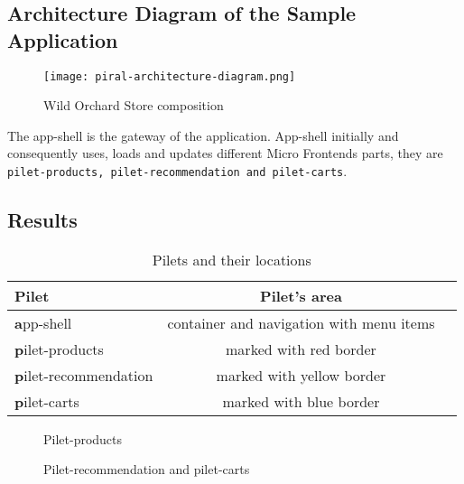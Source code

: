 \documentclass[a4paper]{book}
\begin{document}
\subsection{Architecture Diagram of the Sample Application}
\clearpage
\begin{figure}[ht!]
  \centering
  \captionsetup{justification=centering}
  \texttt{[image: piral-architecture-diagram.png]}
  \caption{Wild Orchard Store composition}
  \label{fig:piral-architecture-diagram}
\end{figure}
The app-shell is the gateway of the application. App-shell initially and consequently uses, loads and updates different Micro Frontends parts, they are \verb|pilet-products, pilet-recommendation and pilet-carts|.

\subsection{Results}

\begin{table}[h!]
    \captionsetup{justification=centering}
    \caption{Pilets and their locations}
    \label{tab:example_1}
    \centering
    \begin{tabular}{l | cc}
	\toprule
			\textbf{Pilet} & \textbf{Pilet's area}\\
	\midrule
	\textbf app-shell & container and navigation with menu items\\
	\textbf pilet-products              & marked with red border\\
	\textbf pilet-recommendation             & marked with yellow border\\
	\textbf pilet-carts              & marked with blue border\\
	\bottomrule
    \end{tabular}
\end{table}


\begin{figure}[h!]
    \centering
    \captionsetup{justification=centering}
    \hspace*{0.1\hsize}
    \caption{Pilet-products}
    \label{fig:Pilet-products}
\end{figure}

\begin{figure}[h!]
    \centering
    \captionsetup{justification=centering}
    \hspace*{0.1\hsize}
    \caption{Pilet-recommendation and pilet-carts}
    \label{fig:ui-product-details-repo}
\end{figure}
\end{document}
